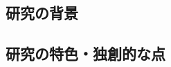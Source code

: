 \documentclass[11pt,a4paper,twoside,dvipdfmx]{jarticle}		%
\def\rem#1{ {\bf\textcolor{red}{($\clubsuit$ #1 $\clubsuit$)}}}
\newcommand{\研究課題名}{粒子加速器を用いた電弱相互作用を持つ新物理の探索}
\newcommand{\研究機関名}{東京大学}
\newcommand{\申請者氏名}{千草颯}
\newcommand{\研究代表者氏名}{\申請者氏名}
\newcommand{\研究期間の最終元号年度}{34}	%
\begin{document}
\subsection{研究の背景}
\newcommand{\研究の背景}{%

\vspace*{1mm}

\fcolorbox{black}{my_gray}{これからの研究計画の背景}

\vspace*{1mm}

\vspace*{1mm}

\fcolorbox{black}{my_gray}{問題点と解決すべき点、着想に至った経緯等}

\vspace*{1mm}



}

\subsection{研究の特色・独創的な点}
\newcommand{\研究の特色と独創的な点}{%

\vspace*{1mm}

\fcolorbox{black}{my_gray}{特色、独創的な点}

\rem{Fat Jet!!}

\vspace*{1mm}

\vspace*{1mm}

\fcolorbox{black}{my_gray}{位置付け、意義}

\vspace*{1mm}


\fcolorbox{black}{my_gray}{インパクトおよび将来の見通し}

}
\end{document}
